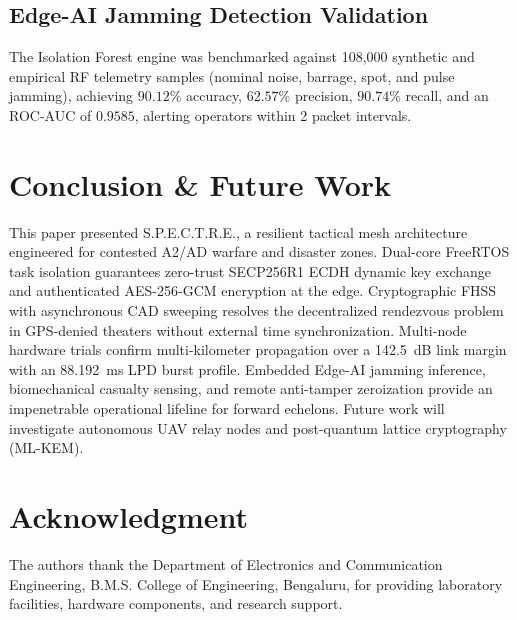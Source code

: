 \documentclass[conference]{IEEEtran}
\begin{document}
\subsection{Edge-AI Jamming Detection Validation}
The Isolation Forest engine was benchmarked against 108,000 synthetic and empirical RF telemetry samples (nominal noise, barrage, spot, and pulse jamming), achieving $90.12\%$ accuracy, $62.57\%$ precision, $90.74\%$ recall, and an ROC-AUC of $0.9585$, alerting operators within 2 packet intervals.

\section{Conclusion \& Future Work}
This paper presented S.P.E.C.T.R.E., a resilient tactical mesh architecture engineered for contested A2/AD warfare and disaster zones. Dual-core FreeRTOS task isolation guarantees zero-trust SECP256R1 ECDH dynamic key exchange and authenticated AES-256-GCM encryption at the edge. Cryptographic FHSS with asynchronous CAD sweeping resolves the decentralized rendezvous problem in GPS-denied theaters without external time synchronization. Multi-node hardware trials confirm multi-kilometer propagation over a 142.5~dB link margin with an 88.192~ms LPD burst profile. Embedded Edge-AI jamming inference, biomechanical casualty sensing, and remote anti-tamper zeroization provide an impenetrable operational lifeline for forward echelons. Future work will investigate autonomous UAV relay nodes and post-quantum lattice cryptography (ML-KEM).

\section*{Acknowledgment}
The authors thank the Department of Electronics and Communication Engineering, B.M.S. College of Engineering, Bengaluru, for providing laboratory facilities, hardware components, and research support.
\end{document}
